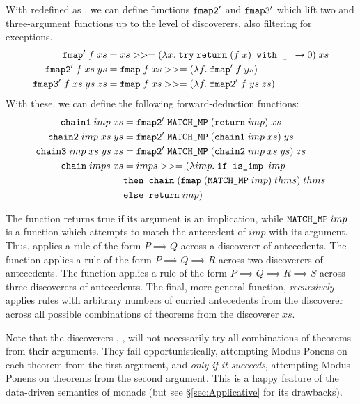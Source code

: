 With  redefined as , we can define functions $\texttt{fmap2}'$ and $\texttt{fmap3}'$ which lift two and three-argument functions up to the level of discoverers, also filtering for exceptions.
\begin{align*}
\texttt{fmap}'\;f\;xs &= xs >>= (\lambda x.\;\texttt{try}\; \texttt{return}\;(f\;x)  \texttt{ with \_ } \rightarrow 0)\;xs\\
\texttt{fmap2}'\;f\;xs\;ys &= \texttt{fmap}\;f\;xs >>= (\lambda f.\;\texttt{fmap}'\;f\;ys)\\
\texttt{fmap3}'\;f\;xs\;ys\;zs &= \texttt{fmap}\;f\;xs >>= (\lambda f.\;\texttt{fmap2}'\;f\;ys\;zs)
\end{align*}
With these, we can define the following forward-deduction functions:
\begin{align*}
\texttt{chain1}\;imp\;xs &= \texttt{fmap2}'\; \texttt{MATCH\_MP}\; (\texttt{return}\;imp)\;xs \\
\texttt{chain2}\;imp\;xs\;ys &= \texttt{fmap2}'\; \texttt{MATCH\_MP}\; (\texttt{chain1}\; imp\;xs)\;ys\\
\texttt{chain3}\;imp\;xs\;ys\;zs &= \texttt{fmap2}'\; \texttt{MATCH\_MP}\; (\texttt{chain2}\;imp\;xs\;ys)\;zs\\
\texttt{chain}\;imps\;xs &= imps >>= (\lambda imp.\;\texttt{if is\_imp } imp\\ &\texttt{then } \texttt{chain}\;(\texttt{fmap}\;(\texttt{MATCH\_MP}\;imp)\;thms)\;thms\\
&\texttt{else } \texttt{return}\; imp)
\end{align*}

The function  returns true if its argument is an implication, while $\texttt{MATCH\_MP}\;imp$ is a function which attempts to match the antecedent of $imp$ with its argument. Thus,  applies a rule of the form $P \implies Q$ across a discoverer of antecedents. The function  applies a rule of the form $P \implies Q \implies R$ across two discoverers of antecedents. The function  applies a rule of the form $P \implies Q \implies R \implies S$ across three discoverers of antecedents. The final, more general function, \emph{recursively} applies rules with arbitrary numbers of curried antecedents from the discoverer  across all possible combinations of theorems from the discoverer $xs$.%

Note that the discoverers , ,  will not necessarily try all combinations of theorems from their arguments. They fail opportunistically, attempting Modus Ponens on each theorem from the first argument, and \emph{only if it succeeds}, attempting Modus Ponens on theorems from the second argument. This is a happy feature of the data-driven semantics of monads (but see \S\ref{sec:Applicative} for its drawbacks). 

